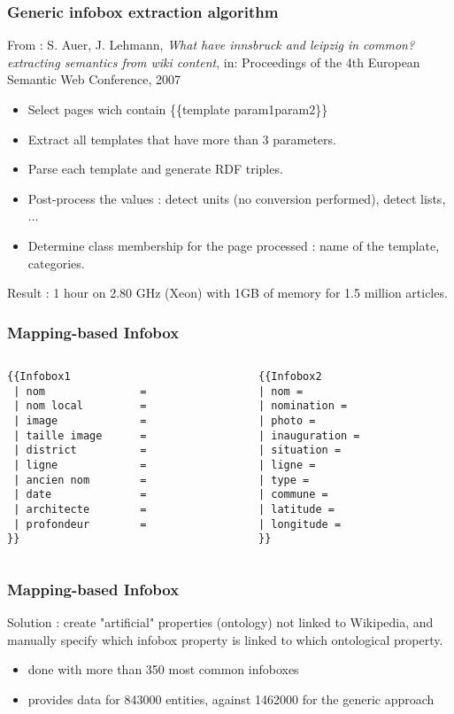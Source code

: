 \documentclass{beamer}
\begin{document}
\begin{frame}[fragile]
	\frametitle{Generic infobox extraction algorithm}
	From : S. Auer, J. Lehmann, \textit{What have innsbruck and leipzig in common? extracting
semantics from wiki content}, in: Proceedings of the 4th European Semantic Web Conference, 2007
	\begin{itemize}
	\item Select pages wich contain \{\{template \textbar param1\textbar param2\}\}
	\item Extract all templates that have more than 3 parameters.
	\item Parse each template and generate RDF triples. 
	\item Post-process the values : detect units (no conversion performed), detect lists, ...
	\item Determine class membership for the page processed : name of the template, categories.
	\end{itemize}
	Result : 1 hour on 2.80 GHz (Xeon) with 1GB of memory for 1.5 million articles.
\end{frame}


\begin{frame}[fragile]
	\frametitle{Mapping-based Infobox}

	\begin{columns}
	\begin{column}{0.5\textwidth}
	\begin{lstlisting}[frame=single]
{{Infobox1
 | nom               = 
 | nom local         = 
 | image             = 
 | taille image      =
 | district          =
 | ligne             = 
 | ancien nom        =
 | date              = 
 | architecte        =
 | profondeur        = 
}}
	\end{lstlisting}
	\end{column}


	\begin{column}{0.5\textwidth}
	\begin{lstlisting}[frame=single]
{{Infobox2
| nom = 
| nomination = 
| photo = 
| inauguration = 
| situation = 
| ligne = 
| type = 
| commune = 
| latitude =   
| longitude = 
}}
	\end{lstlisting}
	\end{column}
	\end{columns}

\end{frame}

\begin{frame}[fragile]
	\frametitle{Mapping-based Infobox}

	Solution : create "artificial" properties (ontology) not linked to Wikipedia, and manually specify which infobox property is linked to which ontological property.

	\begin{itemize}
	\item done with more than 350 most common infoboxes
	\item provides data for 843000 entities, against 1462000 for the generic approach
	\end{itemize}


\end{frame}
\end{document}
